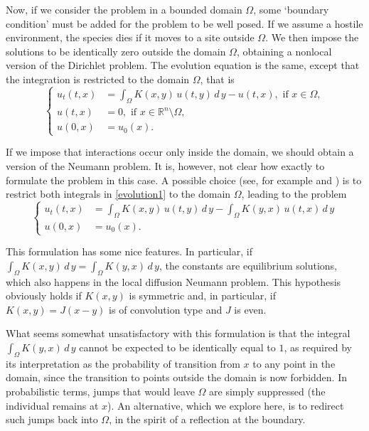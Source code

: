 \documentclass[a4paper,12pt]{amsart}
\newcommand{\R}{\mathbb{R}}
\newcommand{\dis}{\displaystyle}
\begin{document}
  Now, if we consider the problem in a bounded domain $\Omega $, some `boundary condition' must be added for the problem to be well posed.
   If we assume a hostile environment, the species dies if it moves to a site outside $\Omega$. We then impose the solutions to be
    identically zero outside the domain $\Omega$, obtaining a nonlocal version of the Dirichlet problem. The evolution equation is the same,  except that  the integration is restricted to the domain $\Omega$, that is
  \begin{equation*}
      \begin{cases} u_t(t,x) & = \int_{\Omega}   K(x,y) \,
       u(t,y) \,  d\,y
      -  u(t,x), \textrm{ if }  x \in \Omega,  \\
      u(t,x) & =0,  \textrm{ if }  x \in \R^n \setminus \Omega, \\
      u(0,x) & = u_0(x) .
      \end{cases}
     \end{equation*}

   If we impose that  interactions occur only inside the domain, we should obtain a version of the Neumann problem. It is, however, not clear how exactly to formulate the problem in this case.  A possible choice (see, for example \cite{bernal} and  \cite{rossi}) is to restrict both integrals in \eqref{evolution1} to the domain $\Omega$, leading to the problem
   \begin{equation*}
      \begin{cases} u_t(t,x) & = \int_{\Omega}   K(x,y) \,
       u(t,y) \,  d\,y
      -  \int_{\Omega}   K(y,x) \, u(t,x) \, d \, y \\
      u(0,x) & = u_0(x) .
      \end{cases}
     \end{equation*}

      This formulation has some nice features. In particular, if
     $ \displaystyle  \int_{\Omega}   K(x,y)  \,  d\,y
      =  \int_{\Omega}   K(y,x) \, d \, y  $, the constants are equilibrium solutions, which also happens in the local diffusion Neumann  problem. This hypothesis obviously holds  if $K(x,y)$ is symmetric and, in particular, if  $K(x,y) = J(x-y)$ is of convolution type and $J$ is even.

What seems somewhat unsatisfactory  with this formulation is that the integral
$ \dis \int_{\Omega}   K(y,x)  \, d \, y $ cannot {be} expected to be  identically equal to $1$, as
 required by  its interpretation  as the probability of transition from $x$ to any point in the domain, since the transition to points outside the domain is now forbidden.
 {In probabilistic terms, jumps that would leave $\Omega$ are simply suppressed (the individual remains at $x$). An alternative, which we explore here, is to redirect such jumps back into $\Omega$, in the spirit of a reflection at the boundary.}
\end{document}
